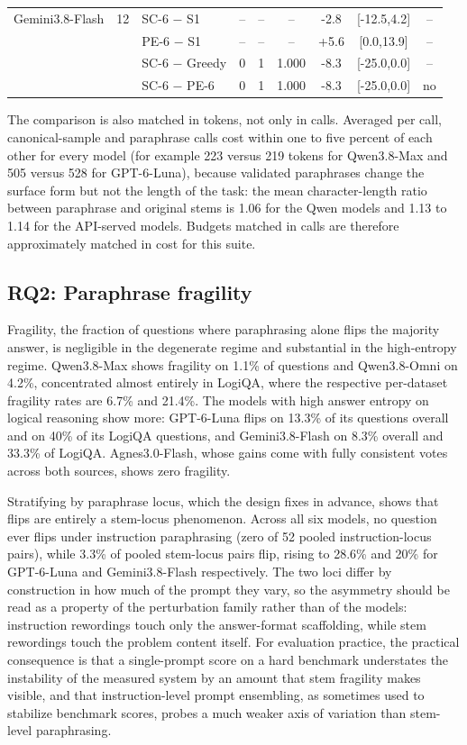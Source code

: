 \documentclass[preprint,12pt]{elsarticle}
\begin{document}
\begin{table}[htbp]
\begin{tabular}{l c l c c c c c c}
Gemini3.8-Flash & 12 & SC-6 $-$ S1 & -- & -- & -- & -2.8 & [-12.5,4.2] & -- \\
 &  & PE-6 $-$ S1 & -- & -- & -- & +5.6 & [0.0,13.9] & -- \\
 &  & SC-6 $-$ Greedy & 0 & 1 & 1.000 & -8.3 & [-25.0,0.0] & -- \\
 &  & SC-6 $-$ PE-6 & 0 & 1 & 1.000 & -8.3 & [-25.0,0.0] & no \\
\bottomrule
\end{tabular}
\end{table}

The comparison is also matched in tokens, not only in calls. Averaged per call, canonical-sample and paraphrase calls cost within one to five percent of each other for every model (for example 223 versus 219 tokens for Qwen3.8-Max and 505 versus 528 for GPT-6-Luna), because validated paraphrases change the surface form but not the length of the task: the mean character-length ratio between paraphrase and original stems is 1.06 for the Qwen models and 1.13 to 1.14 for the API-served models. Budgets matched in calls are therefore approximately matched in cost for this suite.

\subsection{RQ2: Paraphrase fragility}


Fragility, the fraction of questions where paraphrasing alone flips the majority answer, is negligible in the degenerate regime and substantial in the high-entropy regime. Qwen3.8-Max shows fragility on 1.1\% of questions and Qwen3.8-Omni on 4.2\%, concentrated almost entirely in LogiQA, where the respective per-dataset fragility rates are 6.7\% and 21.4\%. The models with high answer entropy on logical reasoning show more: GPT-6-Luna flips on 13.3\% of its questions overall and on 40\% of its LogiQA questions, and Gemini3.8-Flash on 8.3\% overall and 33.3\% of LogiQA. Agnes3.0-Flash, whose gains come with fully consistent votes across both sources, shows zero fragility.

Stratifying by paraphrase locus, which the design fixes in advance, shows that flips are entirely a stem-locus phenomenon. Across all six models, no question ever flips under instruction paraphrasing (zero of 52 pooled instruction-locus pairs), while 3.3\% of pooled stem-locus pairs flip, rising to 28.6\% and 20\% for GPT-6-Luna and Gemini3.8-Flash respectively. The two loci differ by construction in how much of the prompt they vary, so the asymmetry should be read as a property of the perturbation family rather than of the models: instruction rewordings touch only the answer-format scaffolding, while stem rewordings touch the problem content itself. For evaluation practice, the practical consequence is that a single-prompt score on a hard benchmark understates the instability of the measured system by an amount that stem fragility makes visible, and that instruction-level prompt ensembling, as sometimes used to stabilize benchmark scores, probes a much weaker axis of variation than stem-level paraphrasing.
\end{document}

